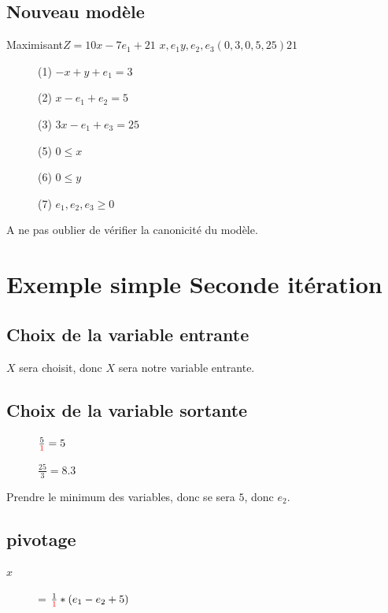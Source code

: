 \subsection{Nouveau modèle}
        {Maximisant}{$Z = 10x - 7e_1 + 21$}
        {$x,e_1$}{$y,e_2,e_3$}{$(0,3,0,5,25)$}{$21$}
        {\begin{description}
\item[] (1) $-x + y + e_1 = 3$
\item[] (2) $x - e_1 + e_2 = 5$
\item[] (3) $3x - e_1 + e_3 = 25$
\item[] (5) $ 0 \leq x$
\item[] (6) $ 0 \leq y$
\item[] (7) $ e_1,e_2,e_3 \geq 0$
\end{description}
}

A ne pas oublier de vérifier la canonicité du modèle.\\

\section{Exemple simple Seconde itération}
\subsection{Choix de la variable entrante}
$X$ sera choisit, donc $X$ sera notre variable entrante.\\

\subsection{Choix de la variable sortante}
\begin{description}
\item[] $\frac{5}{\textcolor{red}{1}} = 5$
\item[] $\frac{25}{3} = 8.3$
\end{description}
Prendre le minimum des variables, donc se sera $5$, donc $e_2$.\\

\subsection{pivotage}
\begin{description}
\item[$x$] = $\frac{1}{\textcolor{red}{1}}*(e_1 - e_2 + 5)$
\end{description}

